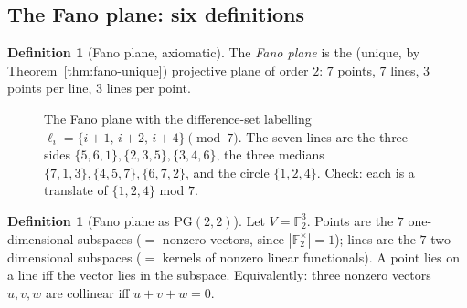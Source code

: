 \documentclass[11pt]{article}
\theoremstyle{definition}
\newtheorem{definition}[theorem]{Definition}
\newcommand{\F}{\mathbb{F}}
\newcommand{\PG}{\mathrm{PG}}
\begin{document}
\subsection{The Fano plane: six definitions}

\begin{definition}[Fano plane, axiomatic]\label{def:fano-ax}
The \emph{Fano plane} is the (unique, by
Theorem~\ref{thm:fano-unique}) projective plane of order $2$: $7$ points, $7$
lines, $3$ points per line, $3$ lines per point.
\end{definition}

\begin{figure}[ht]
\centering
{}
\caption{The Fano plane with the difference-set labelling
$\ell_i = \{i+1,\,i+2,\,i+4\} \pmod 7$. The seven lines are the three sides
$\{5,6,1\},\{2,3,5\},\{3,4,6\}$, the three medians
$\{7,1,3\},\{4,5,7\},\{6,7,2\}$, and the circle $\{1,2,4\}$. Check: each is a
translate of $\{1,2,4\}$ mod $7$.}
\label{fig:fano}
\end{figure}

\begin{definition}[Fano plane as $\PG(2,2)$]\label{def:fano-pg}
Let $V = \F_2^3$. Points are the $7$ one-dimensional subspaces
($=$ nonzero vectors, since $|\F_2^\times| = 1$); lines are the $7$
two-dimensional subspaces ($=$ kernels of nonzero linear functionals). A point
lies on a line iff the vector lies in the subspace. Equivalently: three nonzero
vectors $u,v,w$ are collinear iff $u + v + w = 0$.
\end{definition}
\end{document}
